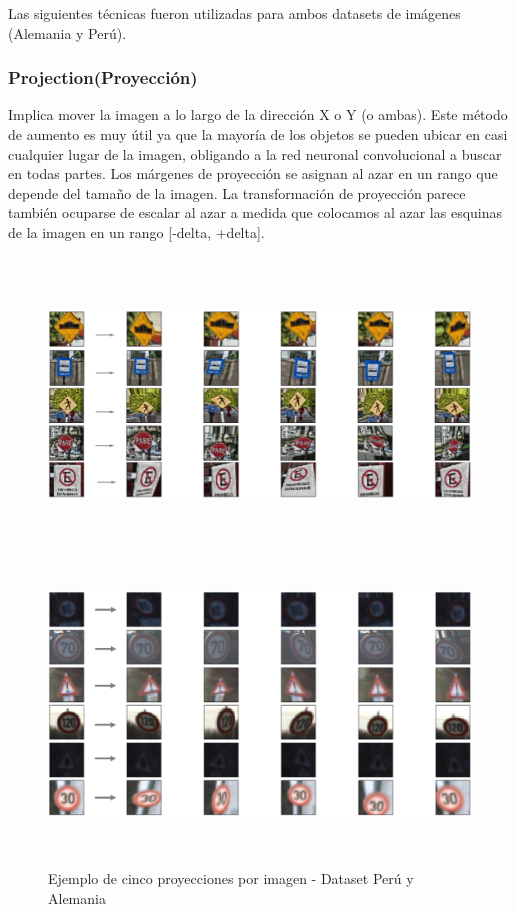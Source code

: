 		Las siguientes técnicas fueron utilizadas para ambos datasets de imágenes (Alemania y Perú).
		
		\subsubsection{Projection(Proyección)}
			Implica mover la imagen a lo largo de la dirección X o Y (o ambas). Este método de aumento es muy útil ya que la mayoría de los objetos se pueden ubicar en casi cualquier lugar de la imagen, obligando a la red neuronal convolucional a buscar en todas partes. Los márgenes de proyección se asignan al azar en un rango que depende del tamaño de la imagen. La transformación de proyección parece también ocuparse de escalar al azar a medida que colocamos al azar las esquinas de la imagen en un rango [-delta, +delta].

			\begin{figure}[H]
				\begin{center}
				\includegraphics[width=1\textwidth,height=7.8cm]{images/desarrollo/Augment/projection_transform3}
				\includegraphics[width=1\textwidth,height=7.8cm]{images/desarrollo/Augment/projection_transform}
				\end{center}
				\begin{center}
				\vspace{1em}
				\caption{\small{Ejemplo de cinco proyecciones por imagen - Dataset Perú y Alemania}}	
				{\small{\fontsize{10}{16.8}\selectfont {Fuente: Elaboración propia}}}
				\end{center}
			\end{figure}
		\newpage
